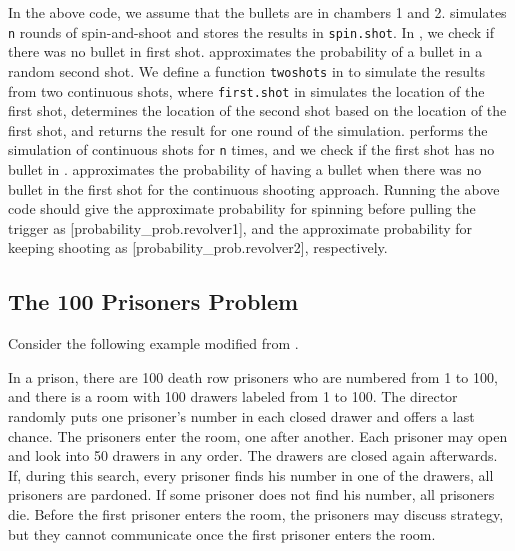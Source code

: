 In the above code, we assume that the bullets are in chambers 1 and 2.  simulates \lstinline{n} rounds of spin-and-shoot and
stores the results in \lstinline{spin.shot}. In , we check if there was
no bullet in first shot.   
 approximates the probability of a bullet in a random second shot.
We define a function \lstinline{twoshots} in  to simulate the results
from two continuous shots, where \lstinline{first.shot} in  simulates the
location of the first shot,  determines the location of the second
shot based on the location of the first shot, and  returns the
result for one round of the simulation. 
 performs the simulation of continuous shots for \lstinline{n} times, and
we check if the first shot has no bullet in . 
approximates the probability of having a bullet when there was no bullet in the
first shot for the continuous shooting approach. 
Running the above code should give the approximate probability for spinning
before pulling the trigger as
[probability_prob.revolver1], and the
approximate probability for keeping shooting as
[probability_prob.revolver2], respectively.

\subsection{The 100 Prisoners Problem}

Consider the following example modified from \cite{flajolet2009analytic}.

\begin{example}
In a prison, there are 100 death row prisoners who are numbered from 1
to 100, and there is a room with 100 drawers labeled from 1 to
100. The director randomly puts one prisoner's number in each closed
drawer and offers a last chance. The prisoners enter the room, one
after another. Each prisoner may open and look into 50 drawers in any
order. The drawers are closed again afterwards. If, during this
search, every prisoner finds his number in one of the drawers, all
prisoners are pardoned. If some prisoner does not find his number, all
prisoners die. Before the first prisoner enters the room, the
prisoners may discuss strategy, but they cannot communicate once the
first prisoner enters the room.
\end{example}

